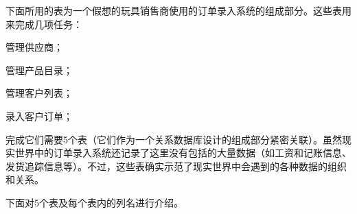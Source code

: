 下面所用的表为一个假想的玩具销售商使用的订单录入系统的组成部分。这些表用来完成几项任务：

\begin{compactitem}
\item 管理供应商；
\item 管理产品目录；
\item 管理客户列表；
\item 录入客户订单；
\end{compactitem}

完成它们需要5个表（它们作为一个关系数据库设计的组成部分紧密关联）。虽然现实世界中的订单录入系统还记录了这里没有包括的大量数据（如工资和记账信息、发货追踪信息等）。不过，这些表确实示范了现实世界中会遇到的各种数据的组织和关系。

下面对5个表及每个表内的列名进行介绍。

